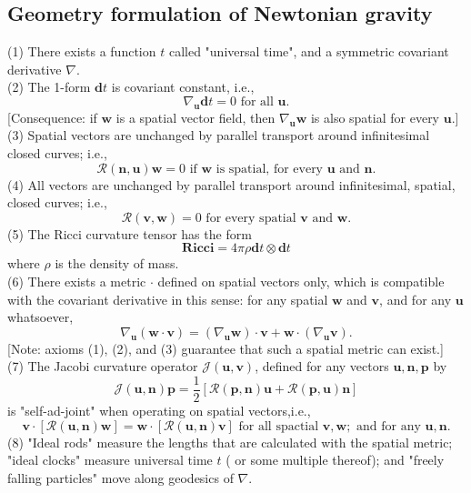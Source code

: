 \documentclass{article}
\begin{document}
\subsection{Geometry formulation of Newtonian gravity}
(1) There exists a function $t$ called "universal time", and a symmetric covariant derivative $\nabla$.\\
(2) The 1-form $\mathbf{d}t$ is covariant constant, i.e.,
\[\nabla_{\mathbf{u}} \mathbf{d}t = 0  \mbox{ for all } \mathbf{u}.
\]
[Consequence: if $\mathbf{w}$ is a spatial vector field, then $\nabla_{\mathbf{u}}\mathbf{w}$ is also spatial for every $\mathbf{u}$.]\\
(3) Spatial vectors are unchanged by parallel transport around infinitesimal closed curves; i.e.,
\[\mathcal{R}(\mathbf{n},\mathbf{u}) \mathbf{w}=0 \mbox{ if }\mathbf{w}\mbox{ is spatial, for every } \mathbf{u} \mbox{ and } \mathbf{n}.\]
(4) All vectors are unchanged by parallel transport around infinitesimal, spatial, closed curves; i.e.,
\[\mathcal{R}(\mathbf{v},\mathbf{w}) =0 \mbox{ for every spatial }\mathbf{v} \mbox{ and } \mathbf{w}.\]
(5) The Ricci curvature tensor has the form
\[\mathbf{Ricci} = 4 \pi \rho \mathbf{d}t \otimes \mathbf{d}t\]
where $\rho$ is the density of mass.\\
(6) There exists a metric $\mathbf{\cdot}$ defined on spatial vectors only, which is compatible with the covariant derivative in this sense: for any spatial $\mathbf{w}$ and $\mathbf{v}$, and for any $\mathbf{u}$ whatsoever,
\[\nabla_{\mathbf{u}}(\mathbf{w} \cdot \mathbf{v}) = (\nabla_{\mathbf{u}} \mathbf{w}) \cdot \mathbf{v} + \mathbf{w} \cdot (\nabla_{\mathbf{u}} \mathbf{v}).\]
[Note: axioms (1), (2), and (3) guarantee that such a spatial metric can exist.]\\
(7) The Jacobi curvature operator $\mathcal{J}(\mathbf{u},\mathbf{v})$, defined for any vectors $\mathbf{u},\mathbf{n},\mathbf{p}$ by
\[\mathcal{J}(\mathbf{u},\mathbf{n})\mathbf{p} = \frac{1}{2}[\mathcal{R}(\mathbf{p},\mathbf{n})\mathbf{u} + \mathcal{R}(\mathbf{p},\mathbf{u})\mathbf{n}]\]
is "self-ad-joint" when operating on spatial vectors,i.e.,
\[\mathbf{v} \cdot [\mathcal{R}(\mathbf{u},\mathbf{n})\mathbf{w}] = 
\mathbf{w} \cdot [\mathcal{R}(\mathbf{u},\mathbf{n})\mathbf{v}] \mbox{ for all spactial }\mathbf{v},\mathbf{w};\mbox{ and for any }\mathbf{u},\mathbf{n}. \]
(8) "Ideal rods" measure the lengths that are calculated with the spatial metric; "ideal clocks" measure universal time $t$ ( or some multiple thereof); and "freely falling particles" move along geodesics of $\nabla$.
\end{document}
